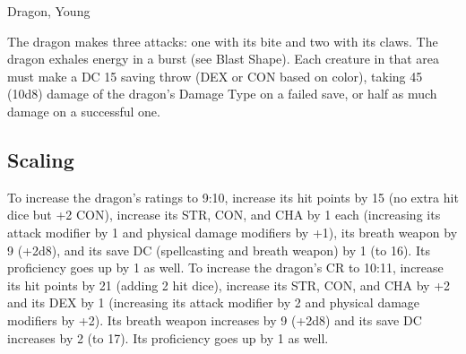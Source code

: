 \begin{DndMonster}[float*=b, width=\textwidth + 8pt]{Dragon, Young}
\begin{multicols}{2}
 The dragon makes three attacks: one with its bite and two with its claws.
\DndMonsterAttack[
	name=Bite,
	distance=melee,
	type=weapon,
	mod=+8,
	reach=10,
	dmg=\DndDice{2d10 + 5},
	dmg-type=piercing,
	extra={ plus 4 (1d8) damage of the dragon's Damage Type.}
]
\DndMonsterAttack[
	name=Claw,
	distance=melee,
	type=weapon,
	mod=+8,
	reach=5,
	dmg=\DndDice{2d6 + 5},
	dmg-type=slashing
]
The dragon exhales energy in a burst (see Blast Shape). Each creature in that area must make a DC 15 saving throw (DEX or CON based on color), taking 45 (10d8) damage of the dragon's Damage Type on a failed save, or half as much damage on a successful one.
\subsection{Scaling}
To increase the dragon's ratings to 9:10, increase its hit points by 15 (no extra hit dice but +2 CON), increase its STR, CON, and CHA by 1 each (increasing its attack modifier by 1 and physical damage modifiers by +1), its breath weapon by 9 (+2d8), and its save DC (spellcasting and breath weapon) by 1 (to 16). Its proficiency goes up by 1 as well.
To increase the dragon's CR to 10:11, increase its hit points by 21 (adding 2 hit dice), increase its STR, CON, and CHA by +2 and its DEX by 1 (increasing its attack modifier by 2 and physical damage modifiers by +2). Its breath weapon increases by 9 (+2d8) and its save DC increases by 2 (to 17). Its proficiency goes up by 1 as well.
\end{multicols}
\end{DndMonster}

